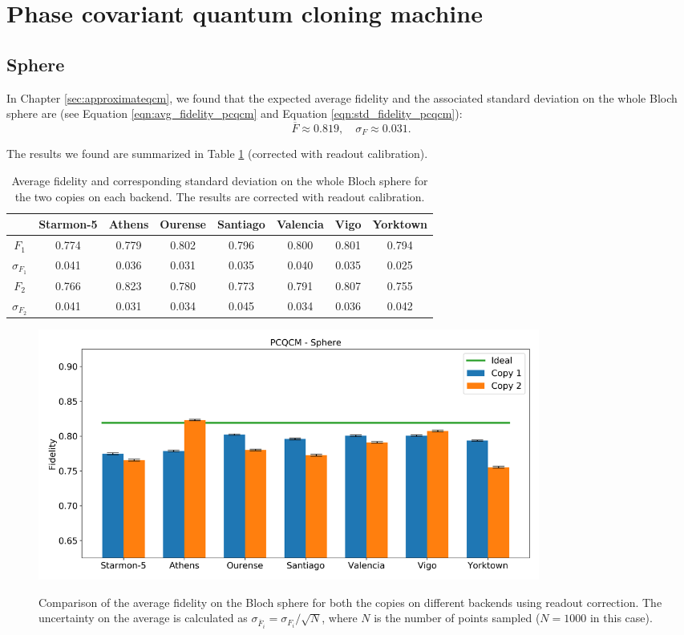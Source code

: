 \section{Phase covariant quantum cloning machine}
\subsection{Sphere}
In Chapter \ref{sec:approximateqcm}, we found that the expected average fidelity and the associated standard deviation on the whole Bloch sphere are (see Equation \ref{eqn:avg_fidelity_pcqcm} and Equation \ref{eqn:std_fidelity_pcqcm}):
\[
  \overline{F}\approx0.819, \quad \sigma_{F}\approx0.031.
\]

The results we found are summarized in Table \ref{tab:results_pcqcm_fullsphere_corrected} (corrected with readout calibration).
\begin{table}[H]
    \centering
    \begin{tabular}{|c|c|c|c|c|c|c|c|}
    \hline
    \textbf{} & \textbf{Starmon-5} & \textbf{Athens} & \textbf{Ourense} & \textbf{Santiago} & \textbf{Valencia} & \textbf{Vigo} & \textbf{Yorktown} \\ \hline
    $F_1$              & 0.774 & 0.779 & 0.802 & 0.796 & 0.800 & 0.801 & 0.794 \\ \hline
    $\sigma_{F_1}$     & 0.041 & 0.036 & 0.031 & 0.035 & 0.040 & 0.035 & 0.025 \\ \hline
    $F_2$              & 0.766 & 0.823 & 0.780 & 0.773 & 0.791 & 0.807 & 0.755 \\ \hline
    $\sigma_{F_2}$     & 0.041 & 0.031 & 0.034 & 0.045 & 0.034 & 0.036 & 0.042 \\ \hline
    \end{tabular}
    \caption{Average fidelity and corresponding standard deviation on the whole Bloch sphere for the two copies on each backend. The results are corrected with readout calibration.}
    \label{tab:results_pcqcm_fullsphere_corrected}
\end{table}
\begin{figure}[H]
  \centering
          \includegraphics[width=0.8\textwidth]{Figures/PhaseCovariant/Histograms/histo_sphere_corrected.png}
      \label{fig:pc_histo_sphere_corrected}
      \caption{Comparison of the average fidelity on the Bloch sphere for both the copies on different backends using readout correction. The uncertainty on the average is calculated as $\sigma_{\overline{F}_i}=\sigma_{F_i}/\sqrt{N}$, where $N$ is the number of points sampled ($N=1000$ in this case).}
\end{figure}

